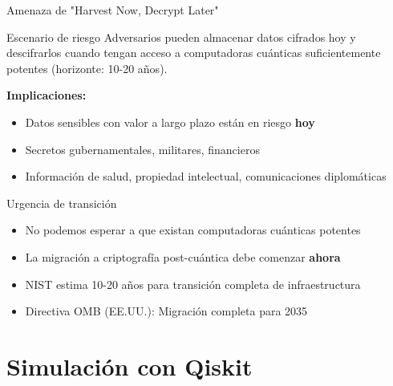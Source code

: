 \documentclass[aspectratio=169]{beamer}
\begin{document}
\begin{frame}{Amenaza de "Harvest Now, Decrypt Later"}
\begin{alertblock}{Escenario de riesgo}
Adversarios pueden almacenar datos cifrados hoy y descifrarlos cuando tengan acceso a computadoras cuánticas suficientemente potentes (horizonte: 10-20 años).
\end{alertblock}

\vspace{0.3cm}
\textbf{Implicaciones:}
\begin{itemize}
\item Datos sensibles con valor a largo plazo están en riesgo \textbf{hoy}
\item Secretos gubernamentales, militares, financieros
\item Información de salud, propiedad intelectual, comunicaciones diplomáticas
\end{itemize}

\vspace{0.3cm}
\begin{block}{Urgencia de transición}
\begin{itemize}
\item No podemos esperar a que existan computadoras cuánticas potentes
\item La migración a criptografía post-cuántica debe comenzar \textbf{ahora}
\item NIST estima 10-20 años para transición completa de infraestructura
\item Directiva OMB (EE.UU.): Migración completa para 2035
\end{itemize}
\end{block}
\end{frame}

\section{Simulación con Qiskit}
\end{document}

